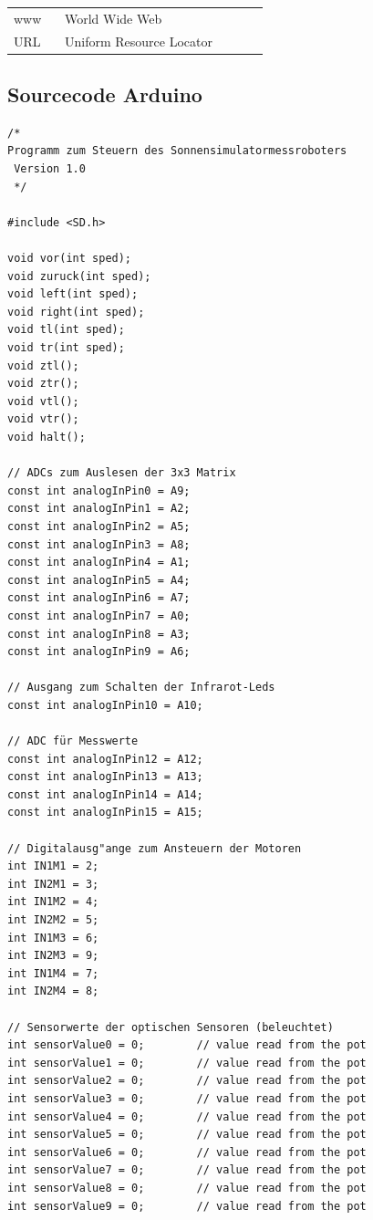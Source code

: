\documentclass[a4paper,bibtotoc,oneside]{scrbook}
\begin{document}
\hspace{-17mm}\begin{tabular}{>{\raggedleft}p{0.2\linewidth} p{0.75\linewidth} p{0.1\linewidth}}
www & World Wide Web \\
URL & Uniform Resource Locator
\end{tabular}


\begin{appendix}
\chapter{Sourcecode Arduino}

\begin{verbatim}
/*
Programm zum Steuern des Sonnensimulatormessroboters
 Version 1.0 
 */

#include <SD.h>

void vor(int sped);
void zuruck(int sped);
void left(int sped);
void right(int sped);
void tl(int sped);
void tr(int sped);
void ztl();
void ztr();
void vtl();
void vtr();
void halt(); 

// ADCs zum Auslesen der 3x3 Matrix
const int analogInPin0 = A9;  
const int analogInPin1 = A2;
const int analogInPin2 = A5;
const int analogInPin3 = A8;
const int analogInPin4 = A1;
const int analogInPin5 = A4;
const int analogInPin6 = A7;
const int analogInPin7 = A0;
const int analogInPin8 = A3;
const int analogInPin9 = A6;

// Ausgang zum Schalten der Infrarot-Leds
const int analogInPin10 = A10;

// ADC für Messwerte
const int analogInPin12 = A12;
const int analogInPin13 = A13;
const int analogInPin14 = A14;
const int analogInPin15 = A15;

// Digitalausg"ange zum Ansteuern der Motoren
int IN1M1 = 2;
int IN2M1 = 3;
int IN1M2 = 4;
int IN2M2 = 5;
int IN1M3 = 6;
int IN2M3 = 9;
int IN1M4 = 7;
int IN2M4 = 8;

// Sensorwerte der optischen Sensoren (beleuchtet)
int sensorValue0 = 0;        // value read from the pot
int sensorValue1 = 0;        // value read from the pot
int sensorValue2 = 0;        // value read from the pot
int sensorValue3 = 0;        // value read from the pot
int sensorValue4 = 0;        // value read from the pot
int sensorValue5 = 0;        // value read from the pot
int sensorValue6 = 0;        // value read from the pot
int sensorValue7 = 0;        // value read from the pot
int sensorValue8 = 0;        // value read from the pot
int sensorValue9 = 0;        // value read from the pot


\end{verbatim}
\end{appendix}
\end{document}
